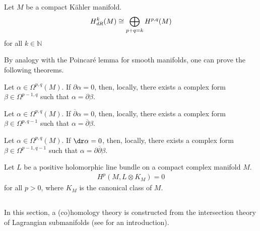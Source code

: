     \begin{theorem}
        Let $M$ be a compact K\"ahler manifold.
        \begin{gather}
            H^k_{\emph{dR}}(M)\cong\bigoplus_{p+q=k}H^{p,q}(M)
        \end{gather}
        for all $k\in\mathbb{N}$
    \end{theorem}

    By analogy with the Poincar\'e lemma for smooth manifolds, one can prove the following theorems.
    \begin{theorem}
        Let $\alpha\in\Omega^{p,q}(M)$. If $\partial\alpha = 0$, then, locally, there exists a complex form $\beta\in\Omega^{p-1,q}$ such that $\alpha = \partial\beta$.
    \end{theorem}
    \begin{theorem}
        Let $\alpha\in\Omega^{p,q}(M)$. If $\overline{\partial}\alpha = 0$, then, locally, there exists a complex form $\beta\in\Omega^{p,q-1}$ such that $\alpha = \overline{\partial}\beta$.
    \end{theorem}
    \begin{theorem}\label{complex:del_delbar_lemma}
        Let $\alpha\in\Omega^{p,q}(M)$. If $\dr\alpha = 0$, then, locally, there exists a complex form $\beta\in\Omega^{p-1,q-1}$ such that $\alpha = \partial\overline{\partial}\beta$.
    \end{theorem}

    \begin{theorem}\label{complex:kodaira_vanishing}
        Let $L$ be a positive holomorphic line bundle on a compact complex manifold $M$.
        \begin{gather}
            H^p(M,L\otimes K_M) = 0
        \end{gather}
        for all $p>0$, where $K_M$ is the canonical class of $M$.
    \end{theorem}

\subsection{}

    In this section, a (co)homology theory is constructed from the intersection theory of Lagrangian submanifolds (see  for an introduction).

